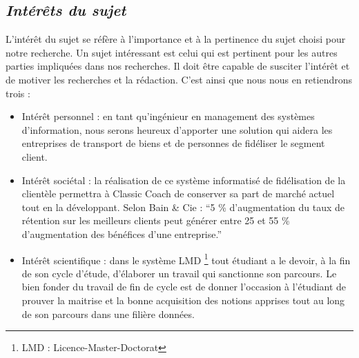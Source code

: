         \subsection[Interet du sujet]{\textit{Intérêts du sujet}}
        L’intérêt du sujet se réfère à l’importance et à la pertinence du sujet choisi pour notre recherche.
        Un sujet intéressant est celui qui est pertinent pour les autres parties impliquées dans nos recherches.
        Il doit être capable de susciter l’intérêt et de motiver les recherches et la rédaction. C’est ainsi
        que nous nous en retiendrons trois :
         \par 
            \begin{itemize}
                \setlength{\itemsep}{0pt}
                \item [\ding{226}] Intérêt personnel : en tant qu’ingénieur en management 
                des systèmes d’information, nous serons heureux d’apporter une solution
                qui aidera les entreprises de transport de biens et de personnes de fidéliser
                le segment client.
                \item [\ding{226}] Intérêt sociétal : la réalisation de ce système
                informatisé de fidélisation de la clientèle permettra à Classic Coach
                de conserver sa part de marché actuel tout en la développant. 
                Selon Bain \& Cie : \enquote{5 \% d’augmentation du taux de
                rétention sur les meilleurs clients peut générer entre 25 et 55 \%
                d’augmentation des bénéfices d’une entreprise.} \cite*{Siecdigi}
                \item [\ding{226}] Intérêt scientifique : dans le système LMD
                \footnote[1]{LMD : Licence-Master-Doctorat} tout étudiant
                a le devoir, à la fin de son cycle d’étude, d’élaborer un travail qui
                sanctionne son parcours. Le bien fonder du travail de fin de cycle
                est de donner l’occasion à l’étudiant de prouver la maitrise et la bonne acquisition
                des notions apprises tout au long de son parcours dans une filière données.
            \end{itemize}
